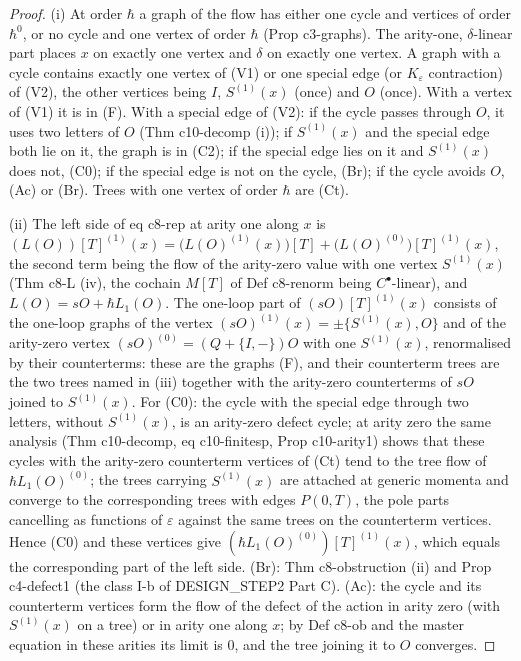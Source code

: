 \documentclass[11pt]{article}
\numberwithin{equation}{section}
\theoremstyle{plain}
\theoremstyle{definition}
\begin{document}
\begin{proof}
(i) At order $\hbar$ a graph of the flow has either one cycle and vertices of order $\hbar^0$, or no cycle and one vertex of order $\hbar$ (Prop c3-graphs). The arity-one, $\delta$-linear part places $x$ on exactly one vertex and $\delta$ on exactly one vertex. A graph with a cycle contains exactly one vertex of (V1) or one special edge (or $K_\varepsilon$ contraction) of (V2), the other vertices being $I$, $S^{(1)}(x)$ (once) and $O$ (once). With a vertex of (V1) it is in (F). With a special edge of (V2): if the cycle passes through $O$, it uses two letters of $O$ (Thm c10-decomp (i)); if $S^{(1)}(x)$ and the special edge both lie on it, the graph is in (C2); if the special edge lies on it and $S^{(1)}(x)$ does not, (C0); if the special edge is not on the cycle, (Br); if the cycle avoids $O$, (Ac) or (Br). Trees with one vertex of order $\hbar$ are (Ct).

(ii) The left side of eq c8-rep at arity one along $x$ is $(L(O))[T]^{(1)}(x)=\big(L(O)^{(1)}(x)\big)[T]+\big(L(O)^{(0)}\big)[T]^{(1)}(x)$, the second term being the flow of the arity-zero value with one vertex $S^{(1)}(x)$ (Thm c8-L (iv), the cochain $M[T]$ of Def c8-renorm being $C^\bullet$-linear), and $L(O)=sO+\hbar L_1(O)$. The one-loop part of $(sO)[T]^{(1)}(x)$ consists of the one-loop graphs of the vertex $(sO)^{(1)}(x)=\pm\{S^{(1)}(x),O\}$ and of the arity-zero vertex $(sO)^{(0)}=(Q+\{I,-\})O$ with one $S^{(1)}(x)$, renormalised by their counterterms: these are the graphs (F), and their counterterm trees are the two trees named in (iii) together with the arity-zero counterterms of $sO$ joined to $S^{(1)}(x)$. For (C0): the cycle with the special edge through two letters, without $S^{(1)}(x)$, is an arity-zero defect cycle; at arity zero the same analysis (Thm c10-decomp, eq c10-finitesp, Prop c10-arity1) shows that these cycles with the arity-zero counterterm vertices of (Ct) tend to the tree flow of $\hbar L_1(O)^{(0)}$; the trees carrying $S^{(1)}(x)$ are attached at generic momenta and converge to the corresponding trees with edges $P(0,T)$, the pole parts cancelling as functions of $\varepsilon$ against the same trees on the counterterm vertices. Hence (C0) and these vertices give $(\hbar L_1(O)^{(0)})[T]^{(1)}(x)$, which equals the corresponding part of the left side. (Br): Thm c8-obstruction (ii) and Prop c4-defect1 (the class I-b of DESIGN\_STEP2 Part C). (Ac): the cycle and its counterterm vertices form the flow of the defect of the action in arity zero (with $S^{(1)}(x)$ on a tree) or in arity one along $x$; by Def c8-ob and the master equation in these arities its limit is $0$, and the tree joining it to $O$ converges.


\end{proof}
\end{document}
